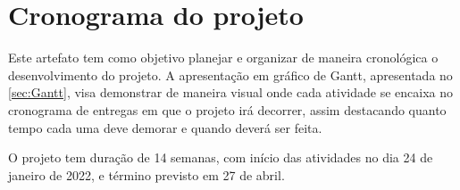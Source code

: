 \chapter{Cronograma do projeto}

Este artefato tem como objetivo planejar e organizar de maneira cronológica o desenvolvimento do projeto. A apresentação em gráfico de Gantt, apresentada no \cref{sec:Gantt}, visa demonstrar de maneira visual onde cada atividade se encaixa no cronograma de entregas em que o projeto irá decorrer, assim destacando quanto tempo cada uma deve demorar e quando deverá ser feita.

O projeto tem duração de 14 semanas, com início das atividades no dia 24 de janeiro de 2022, e término previsto em 27 de abril.
